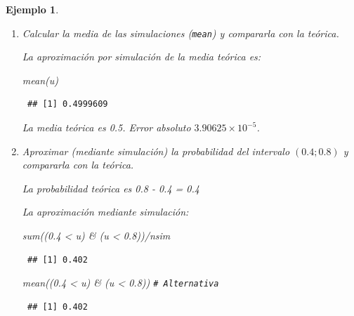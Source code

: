 \documentclass[
]{book}
\newenvironment{Shaded}{\begin{snugshade}}{\end{snugshade}}
\newcommand{\CommentTok}[1]{\textcolor[rgb]{0.56,0.35,0.01}{\textit{#1}}}
\newcommand{\FloatTok}[1]{\textcolor[rgb]{0.00,0.00,0.81}{#1}}
\newcommand{\FunctionTok}[1]{\textcolor[rgb]{0.00,0.00,0.00}{#1}}
\newcommand{\NormalTok}[1]{#1}
\newcommand{\SpecialCharTok}[1]{\textcolor[rgb]{0.00,0.00,0.00}{#1}}
\theoremstyle{break}
\newtheorem{example}{Ejemplo}[chapter]
\theoremstyle{nonumberplain}
\renewcommand{\CommentTok}[1]{\textcolor[rgb]{0.41,0.41,0.41}{\texttt{#1}}}
\begin{document}
\begin{example}
\begin{enumerate}
  \begin{figure}[!htb]

  {\centering \texttt{[image: 02-Generacion\_numeros\_aleatorios\_files/figure-latex/ejcona-1]} 

  }

  \caption{Histograma de los valores generados.}\label{fig:ejcona}
  \end{figure}

  En este caso concreto la distribución de los valores generados es aparentemente más uniforme de lo que cabría esperar, lo que induciría a sospechar de la calidad de este generador (ver Ejemplo \ref{exm:congru512b} en Sección \ref{calgen}).
\item
  Calcular la media de las simulaciones (\texttt{mean}) y compararla con
  la teórica.

  La aproximación por simulación de la media teórica es:

\begin{Shaded}
\begin{Highlighting}[]
\FunctionTok{mean}\NormalTok{(u)}
\end{Highlighting}
\end{Shaded}

\begin{verbatim}
 ## [1] 0.4999609
\end{verbatim}

  La media teórica es 0.5.
  Error absoluto \(\ensuremath{3.90625\times 10^{-5}}\).
\item
  Aproximar (mediante simulación) la probabilidad del intervalo
  \((0.4;0.8)\) y compararla con la teórica.

  La probabilidad teórica es 0.8 - 0.4 = 0.4

  La aproximación mediante simulación:

\begin{Shaded}
\begin{Highlighting}[]
\FunctionTok{sum}\NormalTok{((}\FloatTok{0.4} \SpecialCharTok{\textless{}}\NormalTok{ u) }\SpecialCharTok{\&}\NormalTok{ (u }\SpecialCharTok{\textless{}} \FloatTok{0.8}\NormalTok{))}\SpecialCharTok{/}\NormalTok{nsim}
\end{Highlighting}
\end{Shaded}

\begin{verbatim}
 ## [1] 0.402
\end{verbatim}

\begin{Shaded}
\begin{Highlighting}[]
\FunctionTok{mean}\NormalTok{((}\FloatTok{0.4} \SpecialCharTok{\textless{}}\NormalTok{ u) }\SpecialCharTok{\&}\NormalTok{ (u }\SpecialCharTok{\textless{}} \FloatTok{0.8}\NormalTok{))     }\CommentTok{\# Alternativa}
\end{Highlighting}
\end{Shaded}

\begin{verbatim}
 ## [1] 0.402
\end{verbatim}
\end{enumerate}

\end{example}
\end{document}
